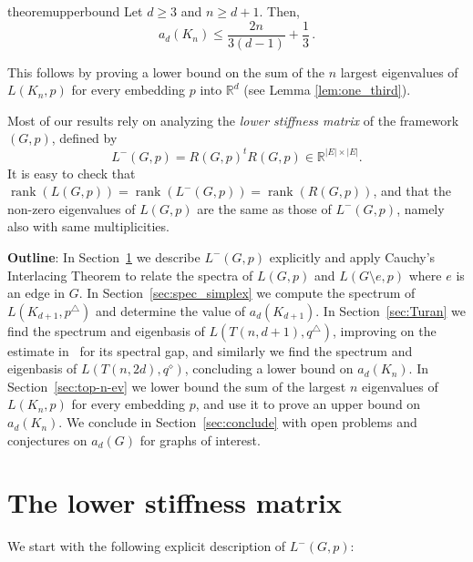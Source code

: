 \documentclass[a4paper,11pt]{article}
\theoremstyle{plain}
\theoremstyle{definition}
\newcommand{\Rea}{{\mathbb R}}
\DeclareMathOperator{\rank}{\text{rank}}
\begin{document}
\begin{restatable}{theorem}{upperbound}\label{cor:upperbound}
Let $d\geq 3$ and $n\geq d+1$. Then, 
\[
    a_d(K_n)\leq \frac{2n}{3(d-1)}+\frac{1}{3}\,.
\]
\end{restatable}
This follows by proving a lower bound on the sum of the $n$ largest eigenvalues of $L(K_n,p)$ for every embedding $p$ into $\Rea^d$ (see Lemma \ref{lem:one_third}).


Most of our results rely on analyzing the \emph{lower stiffness matrix} of the framework $(G,p)$, defined by
\[
    L^{-}(G,p)=R(G,p)^t R(G,p) \in \Rea^{|E|\times |E|}.
\] 
It is easy to check that $\rank(L(G,p))=\rank(L^{-}(G,p))=\rank(R(G,p))$, and that the non-zero eigenvalues of $L(G,p)$ are the same as those of $L^{-}(G,p)$, namely also with same multiplicities.

\textbf{Outline}: In Section~\ref{sec:prelim} we describe $L^{-}(G,p)$ explicitly and apply Cauchy's Interlacing Theorem to relate the spectra of $L(G,p)$ and $L(G\setminus{e},p)$ where $e$ is an edge in $G$.
In Section~\ref{sec:spec_simplex} we compute the spectrum of $L(K_{d+1},p^{\triangle})$ and determine the value of $a_d(K_{d+1})$.
In Section~\ref{sec:Turan} we find the spectrum and eigenbasis of $L(T(n,d+1),q^{\triangle})$, improving on the estimate in~\cite{jordan2020rigidity} for its spectral gap, and similarly we find the spectrum and eigenbasis of $L(T(n,2d),q^{\diamond})$, concluding a lower bound on $a_d(K_n)$.
In Section~\ref{sec:top-n-ev} we lower bound the sum of the largest $n$ eigenvalues of $L(K_n,p)$ for every embedding $p$, and use it to prove an upper bound on $a_d(K_n)$.
We conclude in Section~\ref{sec:conclude} with open problems and conjectures on $a_d(G)$ for graphs of interest.

\section{The lower stiffness matrix}\label{sec:prelim}

We start with the following explicit description of $L^{-}(G,p)$:
\end{document}
